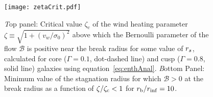\begin{figure}
\texttt{[image: zetaCrit.pdf]}
\caption{\label{fig:zetaCrit} {\emph Top panel:} Critical value
  $\zeta_c$ of the wind heating parameter $\zeta \equiv
  \sqrt{1+(v_w/\sigma_0)^2}$ above which the Bernoulli parameter of
  the flow $\mathcal{B}$ is positive near the break radius for some
  value of $r_s$, calculated for core ($\Gamma=0.1$, dot-dashed line)
  and cusp ($\Gamma=0.8$, solid line) galaxies using
  equation~\eqref{eq:enthAnal}. {\emph Bottom Panel:} Minimum value
  of the stagnation radius for which $\mathcal{B} > 0$ at the break
  radius as a function of $\zeta /\zeta_{\rm c} < 1$ for $r_{\rm b}/r_{\rm inf}=10$.}
\end{figure}



